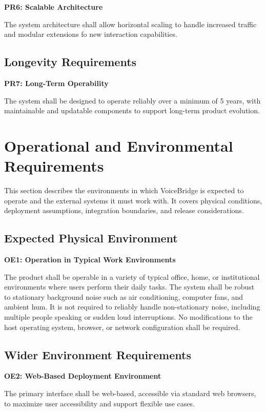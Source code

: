 \documentclass[11pt]{article}
\begin{document}
\textbf{PR6: Scalable Architecture}\label{req:PR6}

The system architecture shall allow horizontal scaling to handle increased traffic and modular extensions fo new interaction capabilities. 
\subsection{Longevity Requirements}\label{subsec:longevity}

\textbf{PR7: Long-Term Operability}\label{req:PR7}

The system shall be designed to operate reliably over a minimum of 5 years, with maintainable and updatable components to support long-term product evolution.

\section{Operational and Environmental Requirements}\label{sec:operational}
This section describes the environments in which VoiceBridge is expected to operate and the external systems it must work with. It covers physical conditions, deployment assumptions, integration boundaries, and release considerations.

\subsection{Expected Physical Environment}\label{subsec:physical-env}

\textbf{OE1: Operation in Typical Work Environments}\label{req:OE1}

The product shall be operable in a variety of typical office, home, or institutional environments where users perform their daily tasks. The system shall be robust to stationary background noise such as air conditioning, computer fans, and ambient hum. It is not required to reliably handle non-stationary noise, including multiple people speaking or sudden loud interruptions. No modifications to the host operating system, browser, or network configuration shall be required.
\subsection{Wider Environment Requirements}\label{subsec:wider-env}

\textbf{OE2: Web-Based Deployment Environment}\label{req:OE2}

The primary interface shall be web-based, accessible via standard web browsers, to maximize user accessibility and support flexible use cases.
\end{document}
